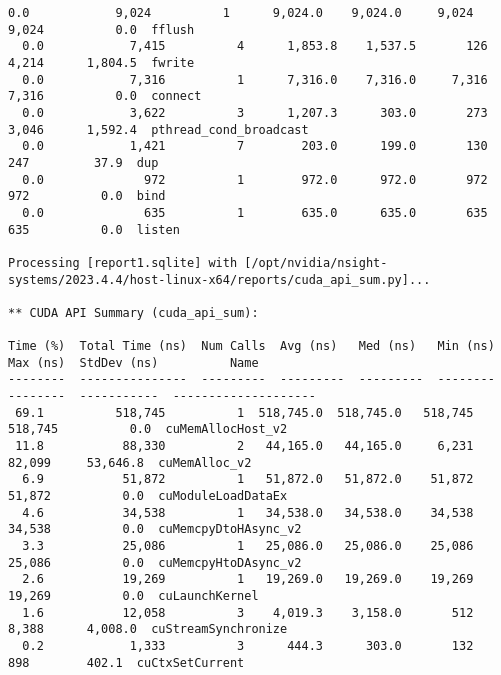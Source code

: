 \documentclass{article}
\begin{document}
\begin{lstlisting}[basicstyle=\tiny]
  0.0            9,024          1      9,024.0    9,024.0     9,024       9,024          0.0  fflush                
  0.0            7,415          4      1,853.8    1,537.5       126       4,214      1,804.5  fwrite                
  0.0            7,316          1      7,316.0    7,316.0     7,316       7,316          0.0  connect               
  0.0            3,622          3      1,207.3      303.0       273       3,046      1,592.4  pthread_cond_broadcast
  0.0            1,421          7        203.0      199.0       130         247         37.9  dup                   
  0.0              972          1        972.0      972.0       972         972          0.0  bind                  
  0.0              635          1        635.0      635.0       635         635          0.0  listen                

Processing [report1.sqlite] with [/opt/nvidia/nsight-systems/2023.4.4/host-linux-x64/reports/cuda_api_sum.py]... 

** CUDA API Summary (cuda_api_sum):

Time (%)  Total Time (ns)  Num Calls  Avg (ns)   Med (ns)   Min (ns)  Max (ns)  StdDev (ns)          Name        
--------  ---------------  ---------  ---------  ---------  --------  --------  -----------  --------------------
 69.1          518,745          1  518,745.0  518,745.0   518,745   518,745          0.0  cuMemAllocHost_v2   
 11.8           88,330          2   44,165.0   44,165.0     6,231    82,099     53,646.8  cuMemAlloc_v2       
  6.9           51,872          1   51,872.0   51,872.0    51,872    51,872          0.0  cuModuleLoadDataEx  
  4.6           34,538          1   34,538.0   34,538.0    34,538    34,538          0.0  cuMemcpyDtoHAsync_v2
  3.3           25,086          1   25,086.0   25,086.0    25,086    25,086          0.0  cuMemcpyHtoDAsync_v2
  2.6           19,269          1   19,269.0   19,269.0    19,269    19,269          0.0  cuLaunchKernel      
  1.6           12,058          3    4,019.3    3,158.0       512     8,388      4,008.0  cuStreamSynchronize 
  0.2            1,333          3      444.3      303.0       132       898        402.1  cuCtxSetCurrent     


\end{lstlisting}

\printbibliography[title={References}]
\end{document}
